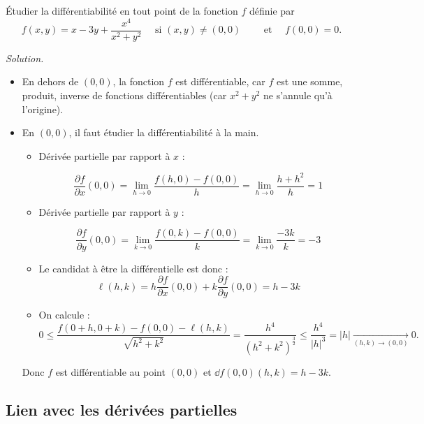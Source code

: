 \documentclass[11pt, class=report,crop=false]{standalone}
\begin{document}
\begin{exemple}
\'Etudier la différentiabilité en tout point de la fonction $f$ définie par
$$f(x,y)= x-3y + \frac{x^4}{x^2+y^2}\quad\mbox{ si }(x,y)\neq (0,0)\qquad \text{ et }\quad f(0,0)=0.$$

 
\bigskip
\emph{Solution.}

\begin{itemize}
  \item En dehors de $(0,0)$, la fonction $f$ est différentiable, car $f$ est une somme, produit, inverse de fonctions différentiables (car $x^2+y^2$ ne s'annule qu'à l'origine).
  
  \item En $(0,0)$, il faut étudier la différentiabilité à la main.
  \begin{itemize}
    \item Dérivée partielle par rapport à $x$ :
      
  $$\frac{\partial f}{\partial x}(0,0) = \lim _{h\to 0}\frac{f(h,0)-f(0,0)}{h}=\lim _{h\to 0}\frac{h+h^2}{h}=1$$
  
    
    \item Dérivée partielle par rapport à $y$ :
      
  $$\frac{\partial f}{\partial y}(0,0) = \lim _{k\to 0}\frac{f(0,k)-f(0,0)}{k}=\lim_{k\to 0}\frac{-3k}{k}=-3$$
    
    \item Le candidat à être la différentielle est donc :
$$\ell(h,k) = 
h \frac{\partial f}{\partial x}(0,0) + 
k \frac{\partial f}{\partial y}(0,0)
= h-3k$$

    \item On calcule :
$$0 \le \frac{f(0+h,0+k) - f(0,0) - \ell(h,k)}{\sqrt{h^2+k^2}}
=  \frac{h^4}{(h^2+k^2)^{\frac{3}{2}}}
\le \frac{h^4}{|h|^3}
=|h|
\xrightarrow[(h,k)\to(0,0)]{} 0
.$$    
    
  \end{itemize}
    
Donc $f$ est différentiable au point $(0,0)$ et $\dd f (0,0)(h,k) = h-3k$.
  
\end{itemize}

\end{exemple}

\subsection{Lien avec les dérivées partielles}
\end{document}
